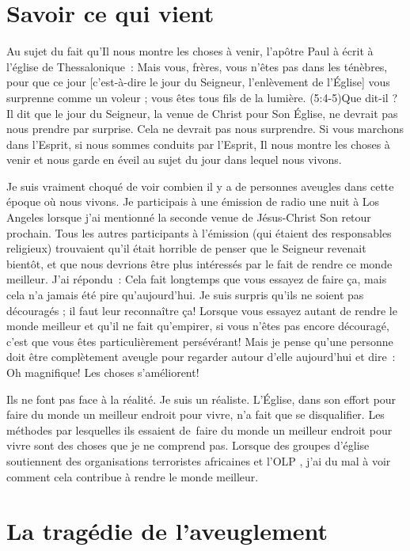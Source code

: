 \section{Savoir ce qui vient}

Au sujet du fait qu'Il nous montre les choses à venir,
 l'apôtre Paul à écrit à l'église de Thessalonique~:
 \Og Mais vous, frères, vous n'êtes pas dans les ténèbres,
 pour que ce jour [c'est-à-dire le jour du Seigneur,
 l'enlèvement de l'Église] vous surprenne comme un voleur ;
 vous êtes tous fils de la lumière. \Fg{}
 (5:4-5)Que dit-il ?
 Il dit que le jour du Seigneur, la venue de Christ
 pour Son Église, ne devrait pas nous prendre par surprise.
 Cela ne devrait pas nous surprendre. Si vous marchons dans l'Esprit,
 si nous sommes conduits par l'Esprit, Il nous montre les choses à venir
 et nous garde en éveil au sujet du jour dans lequel nous vivons.

Je suis vraiment choqué de voir combien il y a de personnes aveugles
 dans cette époque où nous vivons. Je participais à une émission de radio
 une nuit à Los Angeles lorsque j'ai mentionné la seconde venue
 de Jésus-Christ \ocadr Son retour prochain.
 Tous les autres participants à l'émission
 (qui étaient des responsables religieux) trouvaient qu'il était horrible
 de penser que le Seigneur revenait bientôt, et que nous devrions être plus
 intéressés par le fait de rendre ce monde meilleur. J'ai répondu~:
 \Og Cela fait longtemps que vous essayez de faire ça, mais cela n'a jamais
 été pire qu'aujourd'hui. \Fg{}
 Je suis surpris qu'ils ne soient pas découragés ;
 il faut leur reconnaître ça!
 Lorsque vous essayez autant de rendre le monde meilleur et qu'il ne fait
 qu'empirer, si vous n'êtes pas encore découragé, c'est que vous êtes
 particulièrement persévérant!
 Mais je pense qu'une personne doit être complètement aveugle pour regarder
 autour d'elle aujourd'hui et dire~:
 \Og Oh magnifique! Les choses s'améliorent! \Fg{}

Ils ne font pas face à la réalité. Je suis un réaliste.
 L'Église, dans son effort pour faire du monde un meilleur endroit
 pour vivre, n'a fait que se disqualifier.
 Les méthodes par lesquelles ils essaient de~faire du monde un meilleur
 endroit pour vivre sont des choses que je ne comprend pas. 
 Lorsque des groupes d'église soutiennent des organisations terroristes
 africaines et l'OLP ,
 j'ai du mal à voir comment cela contribue à rendre le monde meilleur.

\section{La trag\'edie de l'aveuglement}

